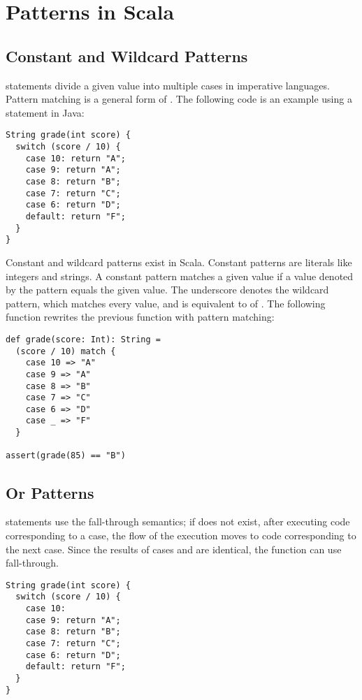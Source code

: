 \section{Patterns in Scala}

\subsection{Constant and Wildcard Patterns}

 statements divide a given value into multiple cases in
imperative languages. Pattern matching is a general form of .
The following code is an example using a  statement in Java:

\begin{verbatim}
String grade(int score) {
  switch (score / 10) {
    case 10: return "A";
    case 9: return "A";
    case 8: return "B";
    case 7: return "C";
    case 6: return "D";
    default: return "F";
  }
}
\end{verbatim}

Constant and wildcard patterns exist in Scala. Constant patterns are
literals like integers and strings. A constant pattern matches a given
value if a value denoted by the pattern equals the given value. The underscore
denotes the wildcard pattern, which matches every value, and is equivalent to
 of . The following function rewrites the
previous function with pattern matching:

\begin{verbatim}
def grade(score: Int): String =
  (score / 10) match {
    case 10 => "A"
    case 9 => "A"
    case 8 => "B"
    case 7 => "C"
    case 6 => "D"
    case _ => "F"
  }

assert(grade(85) == "B")
\end{verbatim}

\subsection{Or Patterns}

 statements use the fall-through semantics; if 
does not exist, after executing code corresponding to a case, the flow of the
execution moves to code corresponding to the next case. Since the results of
cases  and  are identical, the function can use fall-through.

\begin{verbatim}
String grade(int score) {
  switch (score / 10) {
    case 10:
    case 9: return "A";
    case 8: return "B";
    case 7: return "C";
    case 6: return "D";
    default: return "F";
  }
}
\end{verbatim}

